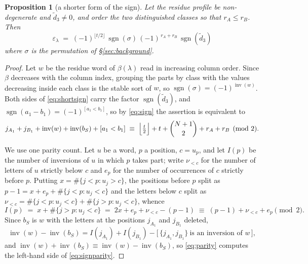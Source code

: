 \documentclass[11pt,reqno]{amsart}
\theoremstyle{plain}
\newtheorem{proposition}[theorem]{Proposition}
\theoremstyle{definition}
\newcommand{\inv}{\operatorname{inv}}
\newcommand{\sgn}{\operatorname{sgn}}
\begin{document}
\begin{proposition}[a shorter form of the sign]\label{rem:sign}
Let the residue profile be non-degenerate and $\tilde d_3\ne0$, and order the two distinguished
classes so that $r_A\le r_B$. Then
\begin{equation}\label{eq:shortsign}
\boxed{\;\;\varepsilon_\lambda\;=\;(-1)^{\lfloor t/2\rfloor}\,\sgn(\sigma)\,(-1)^{\,r_A+r_B}\,
\sgn(\tilde d_3)\;\;}
\end{equation}
where $\sigma$ is the permutation of \S\ref{sec:background}.
\end{proposition}

\begin{proof}
Let $w$ be the residue word of $\beta(\lambda)$ read in increasing column order. Since $\beta$
decreases with the column index, grouping the parts by class with the values decreasing inside each
class is the stable sort of $w$, so $\sgn(\sigma)=(-1)^{\inv(w)}$. Both sides of
\eqref{eq:shortsign} carry the factor $\sgn(\tilde d_3)$, and
$\sgn(a_1-b_1)=(-1)^{[a_1<b_1]}$, so by \eqref{eq:sign} the assertion is equivalent to
\begin{equation}\label{eq:signparity}
j_{A_1}+j_{B_1}+\inv(w)+\inv(b_S)+[a_1<b_1]\;\equiv\;
\Bigl\lfloor\tfrac t2\Bigr\rfloor+t+\binom{N+1}{2}+r_A+r_B \pmod 2 .
\end{equation}

We use one parity count. Let $u$ be a word, $p$ a position, $c=u_p$, and let $I(p)$ be the number of
inversions of $u$ in which $p$ takes part; write $\nu_{<c}$ for the number of letters of $u$ strictly
below $c$ and $e_p$ for the number of occurrences of $c$ strictly before $p$. Putting
$x=\#\{j<p:u_j>c\}$, the positions before $p$ split as $p-1=x+e_p+\#\{j<p:u_j<c\}$ and the letters
below $c$ split as $\nu_{<c}=\#\{j<p:u_j<c\}+\#\{j>p:u_j<c\}$, whence
\begin{equation}\label{eq:parity}
I(p)\;=\;x+\#\{j>p:u_j<c\}\;=\;2x+e_p+\nu_{<c}-(p-1)\;\equiv\;(p-1)+\nu_{<c}+e_p \pmod 2 .
\end{equation}
Since $b_S$ is $w$ with the letters at the positions $j_{A_1}$ and $j_{B_1}$ deleted,
\[
\inv(w)-\inv(b_S)=I(j_{A_1})+I(j_{B_1})
-\bigl[\,\{j_{A_1},j_{B_1}\}\ \text{is an inversion of }w\,\bigr],
\]
and $\inv(w)+\inv(b_S)\equiv\inv(w)-\inv(b_S)$, so \eqref{eq:parity} computes the left-hand side of
\eqref{eq:signparity}.


\end{proof}
\end{document}
